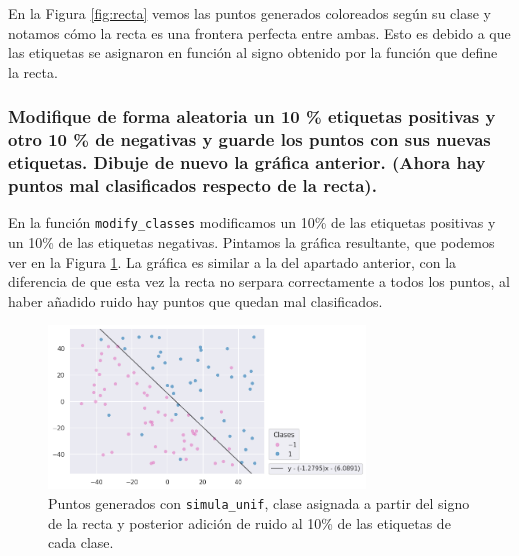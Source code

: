 \documentclass[a4paper, 20pt]{article}
\begin{document}
En la Figura \ref{fig:recta} vemos las puntos generados coloreados según su clase y notamos cómo la recta es una frontera perfecta entre ambas. Esto es debido a que las etiquetas se asignaron en función al signo obtenido por la función que define la recta.

\subsubsection{Modifique de forma aleatoria un 10 \% etiquetas positivas y otro 10 \% de negativas y guarde los puntos con sus nuevas etiquetas. Dibuje de nuevo la gráfica anterior. (Ahora hay puntos mal clasificados respecto de la recta).}

En la función \texttt{modify\_classes} modificamos un 10\% de las etiquetas positivas y un 10\% de las etiquetas negativas. Pintamos la gráfica resultante, que podemos ver en la Figura \ref{fig:2b}. La gráfica es similar a la del apartado anterior, con la diferencia de que esta vez la recta no serpara correctamente a todos los puntos, al haber añadido ruido hay puntos que quedan mal clasificados.

\begin{figure}[H]
    \centering
    \includegraphics[width=0.75\textwidth]{recta+ruido}
    \caption{Puntos generados con \texttt{simula\_unif}, clase asignada a partir del signo de la recta y posterior adición de ruido al 10\% de las etiquetas de cada clase.}
    \label{fig:2b}
\end{figure}
\end{document}
